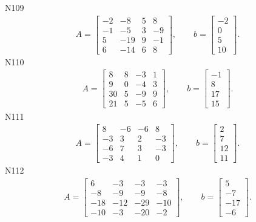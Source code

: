 \documentclass[11pt]{report}
\begin{document}
N109
\begin{align*}
 A = \left[\begin{matrix}-2 & -8 & 5 & 8\\-1 & -5 & 3 & -9\\5 & -19 & 9 & -1\\6 & -14 & 6 & 8\end{matrix}\right],
\qquad b = \left[\begin{matrix}-2\\0\\5\\10\end{matrix}\right]. 
 \end{align*}
N110
\begin{align*}
 A = \left[\begin{matrix}8 & 8 & -3 & 1\\9 & 0 & -4 & 3\\30 & 5 & -9 & 9\\21 & 5 & -5 & 6\end{matrix}\right],
\qquad b = \left[\begin{matrix}-1\\8\\17\\15\end{matrix}\right]. 
 \end{align*}
N111
\begin{align*}
 A = \left[\begin{matrix}8 & -6 & -6 & 8\\-3 & 3 & 2 & -3\\-6 & 7 & 3 & -3\\-3 & 4 & 1 & 0\end{matrix}\right],
\qquad b = \left[\begin{matrix}2\\7\\12\\11\end{matrix}\right]. 
 \end{align*}
N112
\begin{align*}
 A = \left[\begin{matrix}6 & -3 & -3 & -3\\-8 & -9 & -9 & -8\\-18 & -12 & -29 & -10\\-10 & -3 & -20 & -2\end{matrix}\right],
\qquad b = \left[\begin{matrix}5\\-7\\-17\\-6\end{matrix}\right]. 
 \end{align*}
\end{document}
